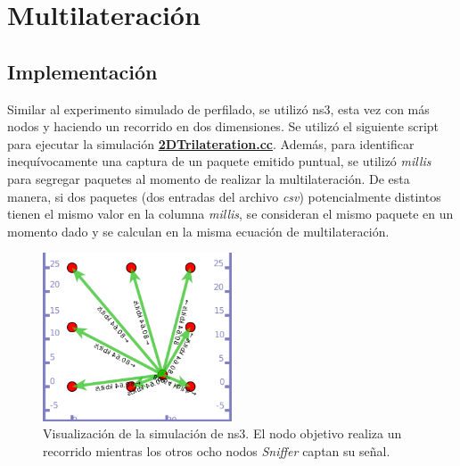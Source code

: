\section{Multilateración}
\subsection{Implementación}
Similar al experimento simulado de perfilado, se utilizó \acs{ns3}, esta vez con más nodos y haciendo un recorrido en dos dimensiones. Se utilizó el siguiente script para ejecutar la simulación \href{https://github.com/agusalex/ns3-rssi-trilateration/blob/main/src/2DTrilateration.cc}{\textbf{2DTrilateration.cc}}.
Además, para identificar inequívocamente una captura de un paquete emitido puntual, se utilizó \emph{millis} para segregar paquetes al momento de realizar la multilateración. De esta manera, si dos paquetes (dos entradas del archivo \textit{csv}) potencialmente distintos tienen el mismo valor en la columna \emph{millis}, se consideran el mismo paquete en un momento dado y se calculan en la misma ecuación de multilateración.
\begin{figure}[!htb]
\centering
\includegraphics[width=0.5\textwidth]{Figuras/multilateration/simulated/multilateration-simulated-ns3.png}
\captionsetup{margin=2cm}
\caption[Visualización de la simulación de \acs{ns3}. El nodo objetivo realiza un recorrido mientras los otros ocho nodos Sniffer captan su señal.]{Visualización de la simulación de \acs{ns3}. El nodo objetivo realiza un recorrido mientras los otros ocho nodos \textit{Sniffer} captan su señal.}
\label{fig:simulated-ns3-mutilateration}
\end{figure}
